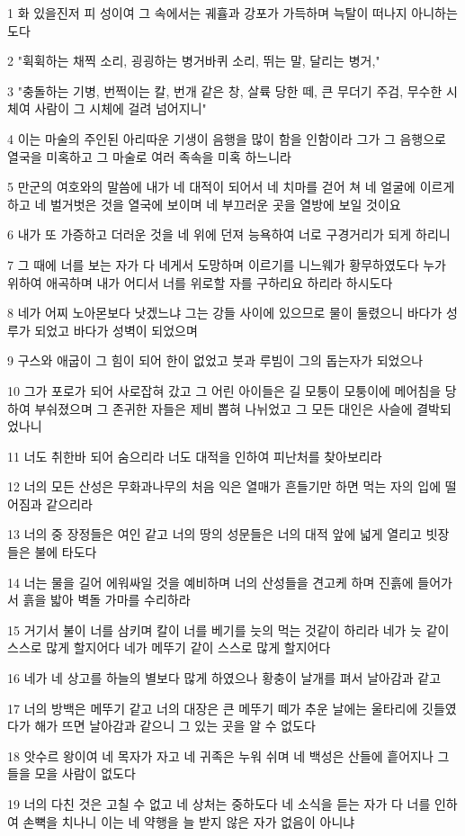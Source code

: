 \par 1 화 있을진저 피 성이여 그 속에서는 궤휼과 강포가 가득하며 늑탈이 떠나지 아니하는도다
\par 2 "휙휙하는 채찍 소리, 굉굉하는 병거바퀴 소리, 뛰는 말, 달리는 병거,"
\par 3 "충돌하는 기병, 번쩍이는 칼, 번개 같은 창, 살륙 당한 떼, 큰 무더기 주검, 무수한 시체여 사람이 그 시체에 걸려 넘어지니"
\par 4 이는 마술의 주인된 아리따운 기생이 음행을 많이 함을 인함이라 그가 그 음행으로 열국을 미혹하고 그 마술로 여러 족속을 미혹 하느니라
\par 5 만군의 여호와의 말씀에 내가 네 대적이 되어서 네 치마를 걷어 쳐 네 얼굴에 이르게 하고 네 벌거벗은 것을 열국에 보이며 네 부끄러운 곳을 열방에 보일 것이요
\par 6 내가 또 가증하고 더러운 것을 네 위에 던져 능욕하여 너로 구경거리가 되게 하리니
\par 7 그 때에 너를 보는 자가 다 네게서 도망하며 이르기를 니느웨가 황무하였도다 누가 위하여 애곡하며 내가 어디서 너를 위로할 자를 구하리요 하리라 하시도다
\par 8 네가 어찌 노아몬보다 낫겠느냐 그는 강들 사이에 있으므로 물이 둘렸으니 바다가 성루가 되었고 바다가 성벽이 되었으며
\par 9 구스와 애굽이 그 힘이 되어 한이 없었고 붓과 루빔이 그의 돕는자가 되었으나
\par 10 그가 포로가 되어 사로잡혀 갔고 그 어린 아이들은 길 모퉁이 모퉁이에 메어침을 당하여 부숴졌으며 그 존귀한 자들은 제비 뽑혀 나뉘었고 그 모든 대인은 사슬에 결박되었나니
\par 11 너도 취한바 되어 숨으리라 너도 대적을 인하여 피난처를 찾아보리라
\par 12 너의 모든 산성은 무화과나무의 처음 익은 열매가 흔들기만 하면 먹는 자의 입에 떨어짐과 같으리라
\par 13 너의 중 장정들은 여인 같고 너의 땅의 성문들은 너의 대적 앞에 넓게 열리고 빗장들은 불에 타도다
\par 14 너는 물을 길어 에워싸일 것을 예비하며 너의 산성들을 견고케 하며 진흙에 들어가서 흙을 밟아 벽돌 가마를 수리하라
\par 15 거기서 불이 너를 삼키며 칼이 너를 베기를 늣의 먹는 것같이 하리라 네가 늣 같이 스스로 많게 할지어다 네가 메뚜기 같이 스스로 많게 할지어다
\par 16 네가 네 상고를 하늘의 별보다 많게 하였으나 황충이 날개를 펴서 날아감과 같고
\par 17 너의 방백은 메뚜기 같고 너의 대장은 큰 메뚜기 떼가 추운 날에는 울타리에 깃들였다가 해가 뜨면 날아감과 같으니 그 있는 곳을 알 수 없도다
\par 18 앗수르 왕이여 네 목자가 자고 네 귀족은 누워 쉬며 네 백성은 산들에 흩어지나 그들을 모을 사람이 없도다
\par 19 너의 다친 것은 고칠 수 없고 네 상처는 중하도다 네 소식을 듣는 자가 다 너를 인하여 손뼉을 치나니 이는 네 약행을 늘 받지 않은 자가 없음이 아니냐


